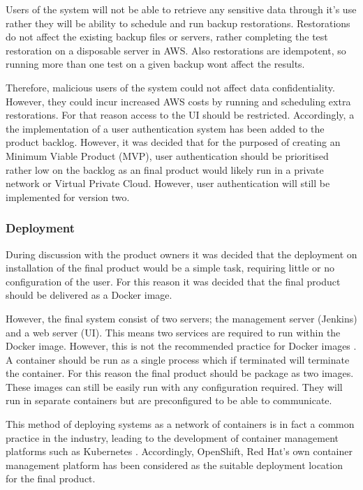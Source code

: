   Users of the system will not be able to retrieve any sensitive data through it's use rather they will be ability to schedule and run backup restorations. Restorations do not affect the existing backup files or servers, rather completing the test restoration on a disposable server in AWS. Also restorations are idempotent, so running more than one test on a given backup wont affect the results.
  
  Therefore, malicious users of the system could not affect data confidentiality. However, they could incur increased AWS costs by running and scheduling extra restorations. For that reason access to the UI should be restricted.  Accordingly, a the implementation of a user authentication system has been added to the product backlog. However, it was decided that for the purposed of creating an Minimum Viable Product (MVP), user authentication should be prioritised rather low on the backlog as an final product would likely run in a private network or Virtual Private Cloud. However, user authentication will still be implemented for version two.
  
  \subsubsection{Deployment}
  During discussion with the product owners it was decided that the deployment on installation of the final product would be a simple task, requiring little or no configuration of the user. For this reason it was decided that the final product should be delivered as a Docker image.
  
  However, the final system consist of two servers; the management server (Jenkins) and a web server (UI). This means two services are required to run within the Docker image. However, this is not the recommended practice for Docker images \citep{docker2}. A container should be run as a single process which if terminated will terminate the container. For this reason the final product should be package as two images. These images can still be easily run with any configuration required. They will run in separate containers but are preconfigured to be able to communicate.
  
  This method of deploying systems as a network of containers is in fact a common practice in the industry, leading to the development of container management platforms such as Kubernetes \citep{kubernetes}. Accordingly, OpenShift, Red Hat's own container management platform has been considered as the suitable deployment location for the final product. 
  
